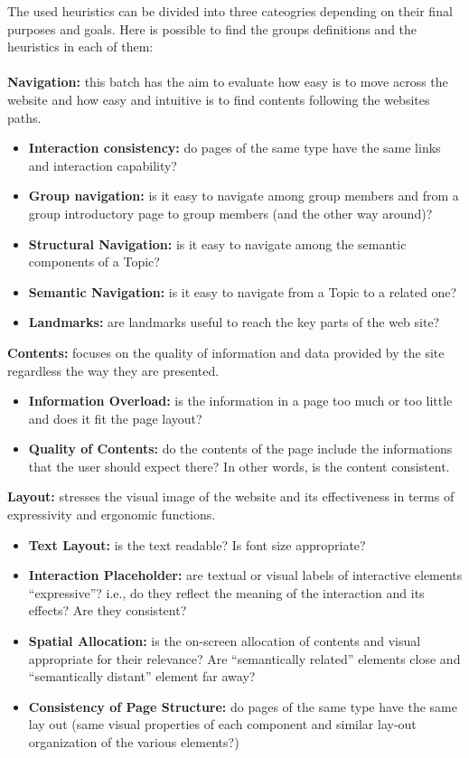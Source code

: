 The used heuristics can be divided into three cateogries depending on their final purposes and goals. Here is possible to find the groups definitions and the heuristics in each of them: \\ 
\\
\textbf{Navigation:} this batch has the aim to evaluate how easy is to move across the website and how easy and intuitive is to find contents following the websites paths.
	\begin{itemize}
		\item \textbf{Interaction consistency:} do pages of the same type have the same links and interaction capability?
		\item \textbf{Group navigation:} is it easy to navigate among group members and from a group introductory page to 				group members (and the other way around)?
		\item \textbf{Structural Navigation:} is it easy to navigate among the semantic components of a Topic?
		\item \textbf{Semantic Navigation:} is it easy to navigate from a Topic to a related one?
		\item \textbf{Landmarks:} are landmarks useful to reach the key parts of the web site?
	\end{itemize}
\textbf{Contents:} focuses on the quality of information and data provided by the site regardless the way they are presented. 
	\begin{itemize}
		\item \textbf{Information Overload:} is the information in a page too much or too little and does it fit the page layout?
		\item \textbf{Quality of Contents:} do the contents of the page include the informations that the user should expect 				there? In other words, is the content consistent.
	\end{itemize}
\textbf{Layout:} stresses the visual image of the website and its effectiveness in terms of expressivity and ergonomic functions. 
	\begin{itemize}
		\item \textbf{Text Layout:} is the text readable? Is font size appropriate?
		\item \textbf{Interaction Placeholder:} are textual or visual labels of interactive elements “expressive”? i.e., do they reflect 			the meaning of the interaction and its effects? Are they consistent?
		\item \textbf{Spatial Allocation:} is the on-screen allocation of contents and visual appropriate for their relevance? Are 				“semantically related” elements close and “semantically distant” element far away?
		\item \textbf{Consistency of Page Structure:} do pages of the same type have the same lay out (same visual properties of 			each component and similar lay-out organization of the various elements?) 
	\end{itemize}
